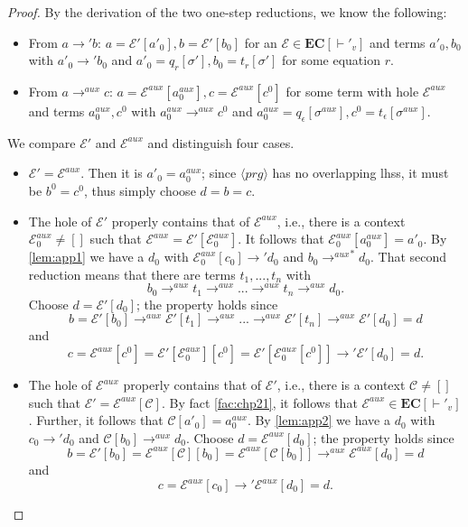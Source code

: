 \cdpaux*
\begin{proof}
By the derivation of the two one-step reductions, we know the following:
\begin{itemize}
\item From $a \longrightarrow' b$: $a = \mathcal{E}'[a'_0], b = \mathcal{E}'[b_0]$ for an $\mathcal{E} \in \mathbf{EC}[\vdash'_v]$ and terms $a'_0, b_0$ with $a'_0 \longrightarrow' b_0$ and $a'_0 = q_r[\sigma'], b_0 = t_r[\sigma']$ for some equation $r$.

\item From $a \longrightarrow^{aux} c$: $a = \mathcal{E}^{aux}[a^{aux}_0], c = \mathcal{E}^{aux}[c^0]$ for some term with hole $\mathcal{E}^{aux}$ and terms $a^{aux}_0, c^0$ with $a^{aux}_0 \longrightarrow^{aux} c^0$ and $a^{aux}_0 = q_\epsilon[\sigma^{aux}], c^0 = t_\epsilon[\sigma^{aux}]$.
\end{itemize}

We compare $\mathcal{E}'$ and $\mathcal{E}^{aux}$ and distinguish four cases.
\begin{itemize}
\item $\mathcal{E}' = \mathcal{E}^{aux}$. Then it is $a'_0 = a^{aux}_0$; since $\langle prg \rangle$ has no overlapping lhss, it must be $b^0 = c^0$, thus simply choose $d = b = c$.

\item The hole of $\mathcal{E}'$ properly contains that of $\mathcal{E}^{aux}$, i.e., there is a context $\mathcal{E}^{aux}_0 \neq []$ such that $\mathcal{E}^{aux} = \mathcal{E}'[\mathcal{E}^{aux}_0]$. It follows that $\mathcal{E}^{aux}_0[a^{aux}_0] = a'_0$. By \autoref{lem:app1} we have a $d_0$ with $\mathcal{E}^{aux}_0[c_0] \longrightarrow' d_0$ and $b_0 {\longrightarrow^{aux}}^* d_0$. That second reduction means that there are terms $t_1, ..., t_n$ with
\[
b_0 \longrightarrow^{aux} t_1 \longrightarrow^{aux} ... \longrightarrow^{aux} t_n \longrightarrow^{aux} d_0.
\]
Choose $d = \mathcal{E}'[d_0]$; the property holds since
\[
b = \mathcal{E}'[b_0] \longrightarrow^{aux} \mathcal{E}'[t_1] \longrightarrow^{aux} ... \longrightarrow^{aux} \mathcal{E}'[t_n] \longrightarrow^{aux} \mathcal{E}'[d_0] = d
\]
and
\[
c = \mathcal{E}^{aux}[c^0] = \mathcal{E}'[\mathcal{E}^{aux}_0][c^0] = \mathcal{E}'[\mathcal{E}^{aux}_0[c^0]] \longrightarrow' \mathcal{E}'[d_0] = d.
\]

\item The hole of $\mathcal{E}^{aux}$ properly contains that of $\mathcal{E}'$, i.e., there is a context $\mathcal{C} \neq []$ such that $\mathcal{E}' = \mathcal{E}^{aux}[\mathcal{C}]$. By fact \autoref{fac:chp21}, it follows that $\mathcal{E}^{aux} \in \mathbf{EC}[\vdash'_v]$. Further, it follows that $\mathcal{C}[a'_0] = a^{aux}_0$. By \autoref{lem:app2} we have a $d_0$ with $c_0 \longrightarrow' d_0$ and $\mathcal{C}[b_0] \longrightarrow^{aux} d_0$. Choose $d = \mathcal{E}^{aux}[d_0]$; the property holds since
\[
b = \mathcal{E}'[b_0] = \mathcal{E}^{aux}[\mathcal{C}][b_0] = \mathcal{E}^{aux}[\mathcal{C}[b_0]] \longrightarrow^{aux} \mathcal{E}^{aux}[d_0] = d
\]
and
\[
c = \mathcal{E}^{aux}[c_0] \longrightarrow' \mathcal{E}^{aux}[d_0] = d.
\]


\end{itemize}
\end{proof}
